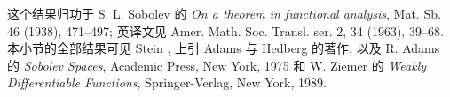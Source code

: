 这个结果归功于 S. L. Sobolev 的 \emph{On a theorem in functional analysis}, Mat. Sb. 46 (1938), 471--497; 英译文见 Amer. Math. Soc. Transl. ser. 2, 34 (1963), 39--68. 本小节的全部结果可见 Stein , 上引 Adams 与 Hedberg 的著作, 以及 R. Adams 的 \emph{Sobolev Spaces}, Academic Press, New York, 1975 和 W. Ziemer 的 \emph{Weakly Differentiable Functions}, Springer-Verlag, New York, 1989.
